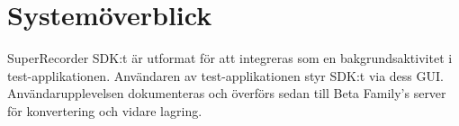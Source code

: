 \section{Systemöverblick}
\label{sec:system_overview}
SuperRecorder SDK:t är utformat för att integreras som en bakgrundsaktivitet i test-applikationen. Användaren av test-applikationen styr SDK:t via dess GUI. \\

Användarupplevelsen dokumenteras och överförs sedan till Beta Family's server för konvertering och vidare lagring.
